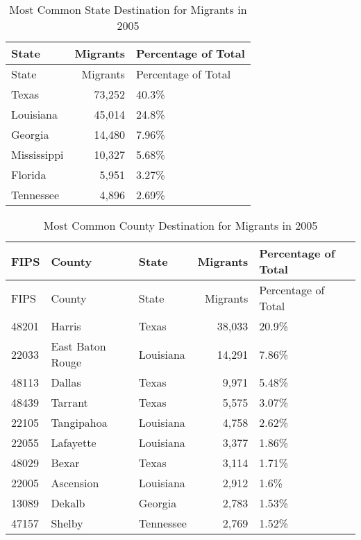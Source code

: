 \documentclass[]{article}
\begin{document}
\begin{longtable}[]{@{}lrl@{}}
\caption{Most Common State Destination for Migrants in 2005
\label{tab:commondeststate}}\tabularnewline
\toprule
State & Migrants & Percentage of Total\tabularnewline
\midrule
\endfirsthead
\toprule
State & Migrants & Percentage of Total\tabularnewline
\midrule
\endhead
Texas & 73,252 & 40.3\%\tabularnewline
Louisiana & 45,014 & 24.8\%\tabularnewline
Georgia & 14,480 & 7.96\%\tabularnewline
Mississippi & 10,327 & 5.68\%\tabularnewline
Florida & 5,951 & 3.27\%\tabularnewline
Tennessee & 4,896 & 2.69\%\tabularnewline
\bottomrule
\end{longtable}

\clearpage

\begin{longtable}[]{@{}lllrl@{}}
\caption{Most Common County Destination for Migrants in 2005
\label{tab:commondest}}\tabularnewline
\toprule
FIPS & County & State & Migrants & Percentage of Total\tabularnewline
\midrule
\endfirsthead
\toprule
FIPS & County & State & Migrants & Percentage of Total\tabularnewline
\midrule
\endhead
48201 & Harris & Texas & 38,033 & 20.9\%\tabularnewline
22033 & East Baton Rouge & Louisiana & 14,291 & 7.86\%\tabularnewline
48113 & Dallas & Texas & 9,971 & 5.48\%\tabularnewline
48439 & Tarrant & Texas & 5,575 & 3.07\%\tabularnewline
22105 & Tangipahoa & Louisiana & 4,758 & 2.62\%\tabularnewline
22055 & Lafayette & Louisiana & 3,377 & 1.86\%\tabularnewline
48029 & Bexar & Texas & 3,114 & 1.71\%\tabularnewline
22005 & Ascension & Louisiana & 2,912 & 1.6\%\tabularnewline
13089 & Dekalb & Georgia & 2,783 & 1.53\%\tabularnewline
47157 & Shelby & Tennessee & 2,769 & 1.52\%\tabularnewline
\bottomrule
\end{longtable}

\clearpage
\end{document}
